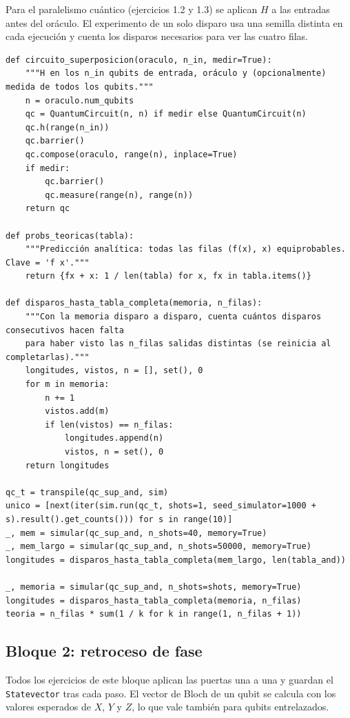 Para el paralelismo cuántico (ejercicios 1.2 y 1.3) se aplican $H$ a las entradas antes del oráculo. El experimento de un solo disparo usa una semilla distinta en cada ejecución y cuenta los disparos necesarios para ver las cuatro filas.

\begin{lstlisting}[caption={Entrada en superposición y experimento de disparos (ejercicios 1.2 y 1.3).},label={lst:b1_superposicion}]
def circuito_superposicion(oraculo, n_in, medir=True):
    """H en los n_in qubits de entrada, oráculo y (opcionalmente) medida de todos los qubits."""
    n = oraculo.num_qubits
    qc = QuantumCircuit(n, n) if medir else QuantumCircuit(n)
    qc.h(range(n_in))
    qc.barrier()
    qc.compose(oraculo, range(n), inplace=True)
    if medir:
        qc.barrier()
        qc.measure(range(n), range(n))
    return qc

def probs_teoricas(tabla):
    """Predicción analítica: todas las filas (f(x), x) equiprobables. Clave = 'f x'."""
    return {fx + x: 1 / len(tabla) for x, fx in tabla.items()}

def disparos_hasta_tabla_completa(memoria, n_filas):
    """Con la memoria disparo a disparo, cuenta cuántos disparos consecutivos hacen falta
    para haber visto las n_filas salidas distintas (se reinicia al completarlas)."""
    longitudes, vistos, n = [], set(), 0
    for m in memoria:
        n += 1
        vistos.add(m)
        if len(vistos) == n_filas:
            longitudes.append(n)
            vistos, n = set(), 0
    return longitudes

qc_t = transpile(qc_sup_and, sim)
unico = [next(iter(sim.run(qc_t, shots=1, seed_simulator=1000 + s).result().get_counts())) for s in range(10)]
_, mem = simular(qc_sup_and, n_shots=40, memory=True)
_, mem_largo = simular(qc_sup_and, n_shots=50000, memory=True)
longitudes = disparos_hasta_tabla_completa(mem_largo, len(tabla_and))

_, memoria = simular(qc_sup_and, n_shots=shots, memory=True)
longitudes = disparos_hasta_tabla_completa(memoria, n_filas)
teoria = n_filas * sum(1 / k for k in range(1, n_filas + 1))
\end{lstlisting}

\subsection{Bloque 2: retroceso de fase}

Todos los ejercicios de este bloque aplican las puertas una a una y guardan el \texttt{Statevector} tras cada paso. El vector de Bloch de un qubit se calcula con los valores esperados de $X$, $Y$ y $Z$, lo que vale también para qubits entrelazados.

